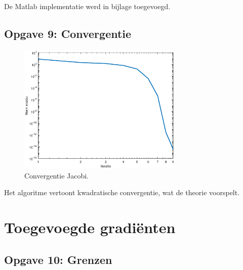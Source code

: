 \documentclass[a4paper]{article}
\newcommand{\opgave}[1]{\subsection{Opgave #1}}
\begin{document}
De Matlab implementatie werd in bijlage toegevoegd.

\opgave{9: Convergentie}\label{sec:oef9}

\begin{figure}[H]
	\begin{center} 
		\includegraphics[width=0.7\textwidth]{Jacobi.eps}
	\end{center}
	\caption{Convergentie Jacobi.}
	\label{fig:Jacobi}
\end{figure}

Het algoritme vertoont kwadratische convergentie, wat de theorie voorspelt.

\section{Toegevoegde gradi\"enten}\label{sec:CG}

\opgave{10: Grenzen}\label{sec:oef10}
\end{document}
